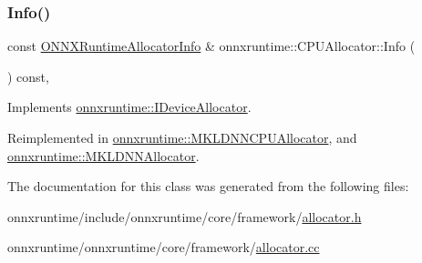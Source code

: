 \subsubsection{\texorpdfstring{Info()}{Info()}}
{\footnotesize\ttfamily const \mbox{\hyperlink{structONNXRuntimeAllocatorInfo}{O\+N\+N\+X\+Runtime\+Allocator\+Info}} \& onnxruntime\+::\+C\+P\+U\+Allocator\+::\+Info (\begin{DoxyParamCaption}{ }\end{DoxyParamCaption}) const\hspace{0.3cm}{\ttfamily [override]}, {\ttfamily [virtual]}}



Implements \mbox{\hyperlink{classonnxruntime_1_1IDeviceAllocator_a46b848cd863bcd50d1e63d48ad96c63c}{onnxruntime\+::\+I\+Device\+Allocator}}.



Reimplemented in \mbox{\hyperlink{classonnxruntime_1_1MKLDNNCPUAllocator_ab5ed702febdae0ac4d7d6f17c3534cc7}{onnxruntime\+::\+M\+K\+L\+D\+N\+N\+C\+P\+U\+Allocator}}, and \mbox{\hyperlink{classonnxruntime_1_1MKLDNNAllocator_ad8e51ea2f30a5bf719c47b5d96de41c1}{onnxruntime\+::\+M\+K\+L\+D\+N\+N\+Allocator}}.



The documentation for this class was generated from the following files\+:\begin{DoxyCompactItemize}
\item 
onnxruntime/include/onnxruntime/core/framework/\mbox{\hyperlink{framework_2allocator_8h}{allocator.\+h}}\item 
onnxruntime/onnxruntime/core/framework/\mbox{\hyperlink{allocator_8cc}{allocator.\+cc}}\end{DoxyCompactItemize}

